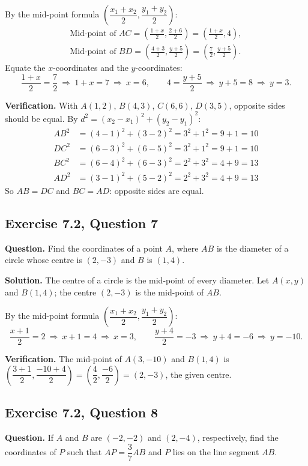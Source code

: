 By the mid-point formula $\left(\dfrac{x_1+x_2}{2},\dfrac{y_1+y_2}{2}\right)$:
\[
\begin{gathered}
\text{Mid-point of }AC=\left(\frac{1+x}{2},\frac{2+6}{2}\right)=\left(\frac{1+x}{2},4\right),\\
\text{Mid-point of }BD=\left(\frac{4+3}{2},\frac{y+5}{2}\right)=\left(\frac72,\frac{y+5}{2}\right).
\end{gathered}
\]
Equate the $x$-coordinates and the $y$-coordinates:
\[
\frac{1+x}{2}=\frac72\ \Rightarrow\ 1+x=7\ \Rightarrow\ x=6,\qquad 4=\frac{y+5}{2}\ \Rightarrow\ y+5=8\ \Rightarrow\ y=3 .
\]

\textbf{Verification.} With $A(1,2)$, $B(4,3)$, $C(6,6)$, $D(3,5)$, opposite sides should be equal. By $d^2=(x_2-x_1)^2+(y_2-y_1)^2$:
\begin{align*}
AB^2&=(4-1)^2+(3-2)^2=3^2+1^2=9+1=10\\
DC^2&=(6-3)^2+(6-5)^2=3^2+1^2=9+1=10\\
BC^2&=(6-4)^2+(6-3)^2=2^2+3^2=4+9=13\\
AD^2&=(3-1)^2+(5-2)^2=2^2+3^2=4+9=13
\end{align*}
So $AB=DC$ and $BC=AD$: opposite sides are equal.


\subsection*{Exercise 7.2, Question 7}
\textbf{Question.} Find the coordinates of a point $A$, where $AB$ is the diameter of a circle whose centre is $(2,-3)$ and $B$ is $(1,4)$.

\textbf{Solution.} The centre of a circle is the mid-point of every diameter. Let $A(x,y)$ and $B(1,4)$; the centre $(2,-3)$ is the mid-point of $AB$.

By the mid-point formula $\left(\dfrac{x_1+x_2}{2},\dfrac{y_1+y_2}{2}\right)$:
\[
\frac{x+1}{2}=2\ \Rightarrow\ x+1=4\ \Rightarrow\ x=3,\qquad \frac{y+4}{2}=-3\ \Rightarrow\ y+4=-6\ \Rightarrow\ y=-10 .
\]

\textbf{Verification.} The mid-point of $A(3,-10)$ and $B(1,4)$ is $\left(\dfrac{3+1}{2},\dfrac{-10+4}{2}\right)=\left(\dfrac42,\dfrac{-6}{2}\right)=(2,-3)$, the given centre.


\subsection*{Exercise 7.2, Question 8}
\textbf{Question.} If $A$ and $B$ are $(-2,-2)$ and $(2,-4)$, respectively, find the coordinates of $P$ such that $AP=\dfrac37AB$ and $P$ lies on the line segment $AB$.

